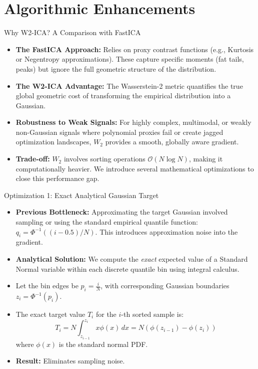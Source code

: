 \documentclass{beamer}
\begin{document}
\section{Algorithmic Enhancements}

\begin{frame}{Why W2-ICA? A Comparison with FastICA}
  \begin{itemize}
    \item \textbf{The FastICA Approach:} Relies on proxy contrast functions (e.g., Kurtosis or Negentropy approximations). These capture specific moments (fat tails, peaks) but ignore the full geometric structure of the distribution.
    \item \textbf{The W2-ICA Advantage:} The Wasserstein-2 metric quantifies the true global geometric cost of transforming the empirical distribution into a Gaussian.
    
    \item \textbf{Robustness to Weak Signals:} For highly complex, multimodal, or weakly non-Gaussian signals where polynomial proxies fail or create jagged optimization landscapes, $W_2$ provides a smooth, globally aware gradient.
    \item \textbf{Trade-off:} $W_2$ involves sorting operations $\mathcal{O}(N \log N)$, making it computationally heavier. We introduce several mathematical optimizations to close this performance gap.
  \end{itemize}
\end{frame}

\begin{frame}{Optimization 1: Exact Analytical Gaussian Target}
  \begin{itemize}
    \item \textbf{Previous Bottleneck:} Approximating the target Gaussian involved sampling or using the standard empirical quantile function: $q_i = \Phi^{-1}((i - 0.5)/N)$. This introduces approximation noise into the gradient.
    \item \textbf{Analytical Solution:} We compute the \textit{exact} expected value of a Standard Normal variable within each discrete quantile bin using integral calculus.
    \item Let the bin edges be $p_i = \frac{i}{N}$, with corresponding Gaussian boundaries $z_i = \Phi^{-1}(p_i)$.
    \item The exact target value $T_i$ for the $i$-th sorted sample is:
      \[
        T_i = N \int_{z_{i-1}}^{z_i} x \phi(x) \, dx = N \left( \phi(z_{i-1}) - \phi(z_i) \right)
      \]
      where $\phi(x)$ is the standard normal PDF.
    \item \textbf{Result:} Eliminates sampling noise.
  \end{itemize}
\end{frame}
\end{document}
